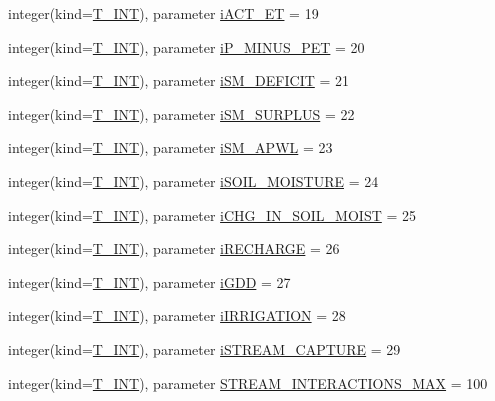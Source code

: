 \begin{DoxyCompactItemize}
\item 
integer(kind=\hyperlink{namespacetypes_a4e4d040a4425196c4d43be63e7e6103a}{T\_\-INT}), parameter \hyperlink{namespacetypes_a5d7a9e58cc5060c7fdfc7466a8f52a60}{iACT\_\-ET} = 19
\item 
integer(kind=\hyperlink{namespacetypes_a4e4d040a4425196c4d43be63e7e6103a}{T\_\-INT}), parameter \hyperlink{namespacetypes_adbfd806dc2d35d39c7984aa32d3a9bed}{iP\_\-MINUS\_\-PET} = 20
\item 
integer(kind=\hyperlink{namespacetypes_a4e4d040a4425196c4d43be63e7e6103a}{T\_\-INT}), parameter \hyperlink{namespacetypes_a87837f70eb7d1089df9cb4595c0f7811}{iSM\_\-DEFICIT} = 21
\item 
integer(kind=\hyperlink{namespacetypes_a4e4d040a4425196c4d43be63e7e6103a}{T\_\-INT}), parameter \hyperlink{namespacetypes_aa8ff1cbf3a33f80c5d9a66d6eca11e11}{iSM\_\-SURPLUS} = 22
\item 
integer(kind=\hyperlink{namespacetypes_a4e4d040a4425196c4d43be63e7e6103a}{T\_\-INT}), parameter \hyperlink{namespacetypes_a65e055348b61912a3790d7b3f4c9bf0a}{iSM\_\-APWL} = 23
\item 
integer(kind=\hyperlink{namespacetypes_a4e4d040a4425196c4d43be63e7e6103a}{T\_\-INT}), parameter \hyperlink{namespacetypes_a71556e5a3ff6e981beafd59949100334}{iSOIL\_\-MOISTURE} = 24
\item 
integer(kind=\hyperlink{namespacetypes_a4e4d040a4425196c4d43be63e7e6103a}{T\_\-INT}), parameter \hyperlink{namespacetypes_aebcbdc031290e54d10c818440fbf0edd}{iCHG\_\-IN\_\-SOIL\_\-MOIST} = 25
\item 
integer(kind=\hyperlink{namespacetypes_a4e4d040a4425196c4d43be63e7e6103a}{T\_\-INT}), parameter \hyperlink{namespacetypes_adeda65abed18e31c0f523efc82f84bde}{iRECHARGE} = 26
\item 
integer(kind=\hyperlink{namespacetypes_a4e4d040a4425196c4d43be63e7e6103a}{T\_\-INT}), parameter \hyperlink{namespacetypes_aefc79ccbcc184af0a988b134d416fb8d}{iGDD} = 27
\item 
integer(kind=\hyperlink{namespacetypes_a4e4d040a4425196c4d43be63e7e6103a}{T\_\-INT}), parameter \hyperlink{namespacetypes_a8fc6acfd1e8720c1ee6432e0de5ceff0}{iIRRIGATION} = 28
\item 
integer(kind=\hyperlink{namespacetypes_a4e4d040a4425196c4d43be63e7e6103a}{T\_\-INT}), parameter \hyperlink{namespacetypes_a15ee2167fce4158f95e9d9846fda5ad5}{iSTREAM\_\-CAPTURE} = 29
\item 
integer(kind=\hyperlink{namespacetypes_a4e4d040a4425196c4d43be63e7e6103a}{T\_\-INT}), parameter \hyperlink{namespacetypes_a4ff333366786c6aa260d0b177b01c29a}{STREAM\_\-INTERACTIONS\_\-MAX} = 100

\end{DoxyCompactItemize}

